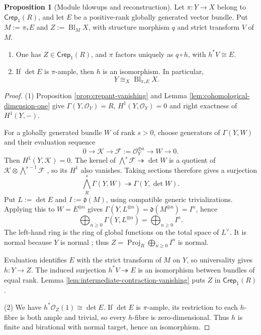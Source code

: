 \documentclass[a4paper,reqno]{amsart}
\def\O{\mathcal{O}}
\theoremstyle{definition}
\newtheorem{Prop}[Thm]{Proposition}
\begin{document}
\begin{Prop}[Module blowups and reconstruction]\label{cor:module-reconstruction}
Let $\pi\colon Y\to X$ belong to $\mathsf{Crep}_1(R)$, and let $E$ be a positive-rank globally generated vector bundle. Put $M:=\pi_*E$ and $Z:=\operatorname{Bl}_M X$, with structure morphism $q$ and strict transform $V$ of $M$.
\begin{enumerate}
\item
One has $Z\in\mathsf{Crep}_1(R)$, and $\pi$ factors uniquely as $q\circ h$, with $h^*V\cong E$.
\item
If $\det E$ is $\pi$-ample, then $h$ is an isomorphism. In particular,
\begin{equation}\label{eq:module-reconstruction}
Y\cong_X\operatorname{Bl}_{\pi_*E}X.
\end{equation}
\end{enumerate}
\end{Prop}
\begin{proof}
(1) Proposition \ref{prop:crepant-vanishing} and Lemma \ref{lem:cohomological-dimension-one} give $\Gamma(Y,\O_Y)=R$, $H^1(Y,\O_Y)=0$ and right exactness of $H^1(Y,-)$.

For a globally generated bundle $W$ of rank $s>0$, choose generators of $\Gamma(Y,W)$ and their evaluation sequence
\[
0\longrightarrow\mathcal K\longrightarrow\mathcal F:=\O_Y^{\oplus a}
\longrightarrow W\longrightarrow0.
\]
Then $H^1(Y,\mathcal K)=0$. The kernel of $\bigwedge^s\mathcal F\twoheadrightarrow\det W$ is a quotient of $\mathcal K\otimes\bigwedge^{s-1}\mathcal F$ \cite[Tag 00DO]{stacks-project}, so its $H^1$ also vanishes. Taking sections therefore gives a surjection
\[
\bigwedge_R^s\Gamma(Y,W)\twoheadrightarrow\Gamma(Y,\det W).
\]
Put $L:=\det E$ and $I:=\mathfrak d(M)$, using compatible generic trivializations. Applying this to $W=E^{\oplus n}$ gives $\Gamma(Y,L^{\otimes n})=\mathfrak d(M^{\oplus n})=I^n$, hence
\begin{equation}\label{eq:determinant-section-ring}
\bigoplus_{n\ge0}\Gamma(Y,L^{\otimes n})
=\bigoplus_{n\ge0}I^n.
\end{equation}
The left-hand ring is the ring of global functions on the total space of $L^\vee$. It is normal because $Y$ is normal \cite[Tag 0358]{stacks-project}; thus $Z=\operatorname{Proj}_R\bigoplus_{n\ge0}I^n$ is normal.

Evaluation identifies $E$ with the strict transform of $M$ on $Y$, so universality gives $h\colon Y\to Z$. The induced surjection $h^*V\twoheadrightarrow E$ is an isomorphism between bundles of equal rank. Lemma \ref{lem:intermediate-contraction-vanishing} puts $Z$ in $\mathsf{Crep}_1(R)$.

(2) We have $h^*\O_Z(1)\cong\det E$. If $\det E$ is $\pi$-ample, its restriction to each $h$-fibre is both ample and trivial, so every $h$-fibre is zero-dimensional. Thus $h$ is finite and birational with normal target, hence an isomorphism.
\end{proof}
\end{document}
